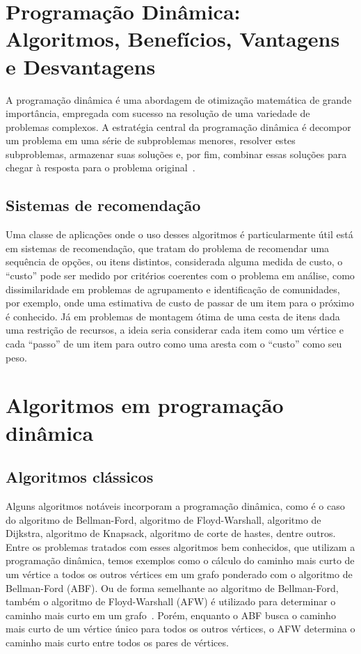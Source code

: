 \section{Programação Dinâmica: Algoritmos, Benefícios, Vantagens e Desvantagens}

A programação dinâmica é uma abordagem de otimização matemática de grande importância, empregada com sucesso na resolução de uma variedade de problemas complexos. A estratégia central da programação dinâmica é decompor um problema em uma série de subproblemas menores, resolver estes subproblemas, armazenar suas soluções e, por fim, combinar essas soluções para chegar à resposta para o problema original~\cite{bellman1957dynamic}.

\subsection{Sistemas de recomendação}

Uma classe de aplicações onde o uso desses algoritmos é particularmente útil está em sistemas de recomendação, que tratam do problema de recomendar uma sequência de opções, ou itens distintos, considerada alguma medida de custo, o ``custo'' pode ser medido por critérios coerentes com o problema em análise, como dissimilaridade em problemas de agrupamento e identificação de comunidades, por exemplo, onde uma estimativa de custo de passar de um item para o próximo é conhecido. Já em problemas de montagem ótima de uma cesta de itens dada uma restrição de recursos, a ideia seria considerar cada item como um vértice e cada ``passo'' de um item para outro como uma aresta com o ``custo'' como seu peso.

\section{Algoritmos em programação dinâmica}
\subsection{Algoritmos clássicos}

Alguns algoritmos notáveis incorporam a programação dinâmica, como é o caso do algoritmo de Bellman-Ford, algoritmo de Floyd-Warshall, algoritmo de Dijkstra, algoritmo de Knapsack, algoritmo de corte de hastes, dentre outros. Entre os problemas tratados com esses algoritmos bem conhecidos, que utilizam a programação dinâmica, temos exemplos como o cálculo do caminho mais curto de um vértice a todos os outros vértices em um grafo ponderado com o algoritmo de Bellman-Ford (ABF). Ou de forma semelhante ao algoritmo de Bellman-Ford, também o algoritmo de Floyd-Warshall (AFW) é utilizado para determinar o caminho mais curto em um grafo~\cite{cormen2009introduction}. Porém, enquanto o ABF busca o caminho mais curto de um vértice único para todos os outros vértices, o AFW determina o caminho mais curto entre todos os pares de vértices.

